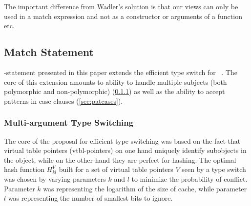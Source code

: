 The important difference from Wadler's solution is that our views can only be 
used in a match expression and not as a constructor or arguments of a function 
etc.

\subsection{Match Statement}
\label{sec:matchstmt}

-statement presented in this paper extends the efficient type switch 
for \Cpp{}~\cite{TS12}. The core of this extension amounts to ability to handle 
multiple subjects (both polymorphic and non-polymorphic) 
(\textsection\ref{sec:multiarg}) as well as the ability to accept patterns in 
case clauses (\textsection\ref{sec:patcases}).

\subsubsection{Multi-argument Type Switching}
\label{sec:multiarg}

The core of the proposal for efficient type switching was based on the fact that 
virtual table pointers (vtbl-pointers) on one hand uniquely identify subobjects 
in the object, while on the other hand they are perfect for hashing. The optimal 
hash function $H_{kl}^V$ built for a set of virtual table pointers $V$ seen by a 
type switch was chosen by varying parameters $k$ and $l$ to minimize the 
probability of conflict. Parameter $k$ was representing the logarithm of the 
size of cache, while parameter $l$ was representing the number of smallest bits 
to ignore.


